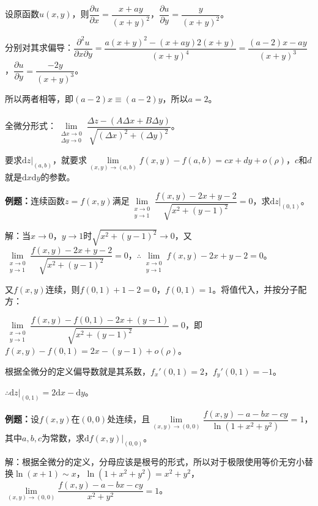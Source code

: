 设原函数$u(x,y)$，则$\dfrac{\partial u}{\partial x}=\dfrac{x+ay}{(x+y)^2}$，$\dfrac{\partial u}{\partial y}=\dfrac{y}{(x+y)^2}$。

分别对其求偏导：$\dfrac{\partial^2u}{\partial x\partial y}=\dfrac{a(x+y)^2-(x+ay)2(x+y)}{(x+y)^4}=\dfrac{(a-2)x-ay}{(x+y)^3}$，$\dfrac{\partial u}{\partial y}=\dfrac{-2y}{(x+y)^3}$。

所以两者相等，即$(a-2)x\equiv(a-2)y$，所以$a=2$。

\paragraph{} \leavevmode \medskip

全微分形式：$\lim\limits_{\substack{\Delta x\to0\\\Delta y\to0}}\dfrac{\Delta z-(A\Delta x+B\Delta y)}{\sqrt{(\Delta x)^2+(\Delta y)^2}}$。

要求$\textrm{d}z|_{(a,b)}$，就要求$\lim\limits_{(x,y)\to(a,b)}f(x,y)-f(a,b)=cx+dy+o(\rho)$，$c$和$d$就是$\textrm{d}x\textrm{d}y$的参数。

\textbf{例题：}连续函数$z=f(x,y)$满足$\lim\limits_{\substack{x\to0\\ y\to1}}\dfrac{f(x,y)-2x+y-2}{\sqrt{x^2+(y-1)^2}}=0$，求$\textrm{d}z|_{(0,1)}$。

解：当$x\to0$，$y\to1$时$\sqrt{x^2+(y-1)^2}\to0$，又$\lim\limits_{\substack{x\to0\\ y\to1}}\dfrac{f(x,y)-2x+y-2}{\sqrt{x^2+(y-1)^2}}=0$，$\therefore\lim\limits_{\substack{x\to0\\ y\to1}}f(x,y)-2x+y-2=0$。

又$f(x,y)$连续，则$f(0,1)+1-2=0$，$f(0,1)=1$。将值代入，并按分子配方：

$\lim\limits_{\substack{x\to0\\ y\to1}}\dfrac{f(x,y)-f(0,1)-2x+(y-1)}{\sqrt{x^2+(y-1)^2}}=0$，即$f(x,y)-f(0,1)=2x-(y-1)+o(\rho)$。

根据全微分的定义偏导数就是其系数，$f_x'(0,1)=2$，$f_y'(0,1)=-1$。

$\therefore\textrm{d}z|_{(0,1)}=2\textrm{d}x-\textrm{d}y$。

\textbf{例题：}设$f(x,y)$在$(0,0)$处连续，且$\lim\limits_{(x,y)\to(0,0)}\dfrac{f(x,y)-a-bx-cy}{\ln(1+x^2+y^2)}=1$，其中$a,b,c$为常数，求$\textrm{d}f(x,y)|_{(0,0)}$。

解：根据全微分的定义，分母应该是根号的形式，所以对于极限使用等价无穷小替换$\ln(x+1)\sim x$，$\ln(1+x^2+y^2)=x^2+y^2$，$\lim\limits_{(x,y)\to(0,0)}\dfrac{f(x,y)-a-bx-cy}{x^2+y^2}=1$。

